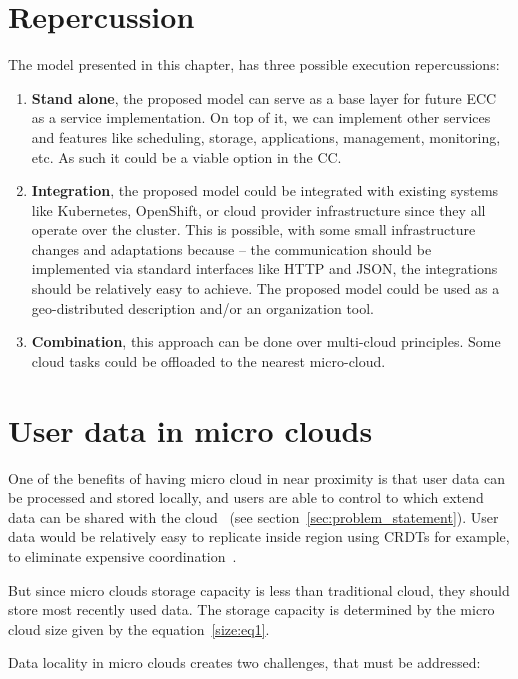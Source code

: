 \section{Repercussion}\label{sec:repercussion}
%
The model presented in this chapter, has three possible execution repercussions:

\begin{enumerate}[start=1,label={(\bfseries \arabic*)}]
	\item \textbf{Stand alone}, the proposed model can serve as a base layer for future ECC as a service implementation. On top of it, we can implement other services and features like scheduling, storage, applications, management, monitoring, etc. As such it could be a viable option in the CC.
	\item \textbf{Integration}, the proposed model could be integrated with existing systems like Kubernetes, OpenShift, or cloud provider infrastructure since they all operate over the cluster. This is possible, with some small infrastructure changes and adaptations because -- the communication should be implemented via standard interfaces like HTTP and JSON, the integrations should be relatively easy to achieve. The proposed model could be used as a geo-distributed description and/or an organization tool.
	\item \textbf{Combination}, this approach can be done over multi-cloud principles. Some cloud tasks could be offloaded to the nearest micro-cloud.
\end{enumerate} 
%
%
\section{User data in micro clouds}\label{sec:user_data}
%
One of the benefits of having micro cloud in near proximity is that user data can be processed and stored locally, and users are able to control to which extend data can be shared with the cloud~\cite{SatyanarayananK19} (see section~\ref{sec:problem_statement}). User data would be relatively easy to replicate inside region using CRDTs for example, to eliminate expensive coordination~\cite{inproceedingsSimic2}.

But since micro clouds storage capacity is less than traditional cloud, they should store most recently used data. The storage capacity is determined by the micro cloud size given by the equation~\ref{size:eq1}.

Data locality in micro clouds creates two challenges, that must be addressed:

